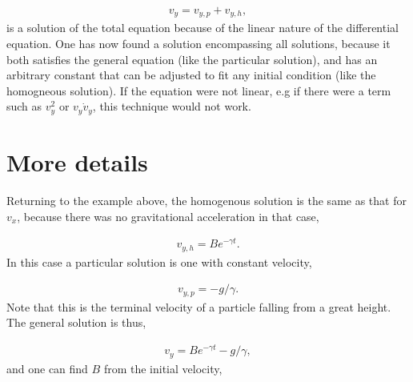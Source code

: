 \documentclass[letterpaper,10pt,english]{sphinxmanual}
\begin{document}
\begin{equation*}
\begin{split}
\begin{equation}
v_y=v_{y,p}+v_{y,h},
\label{_auto9} \tag{9}
\end{equation}
\end{split}
\end{equation*}
is a solution of the total equation because of the linear nature of
the differential equation. One has now found a  solution
encompassing all solutions, because it both satisfies the general
equation (like the particular solution), and has an arbitrary constant
that can be adjusted to fit any initial condition (like the homogneous
solution). If the equation were not linear, e.g if there were a term
such as \(v_y^2\) or \(v_y\dot{v}_y\), this technique would not work.


\section{More details}
\label{\detokenize{chapter1:more-details}}
Returning to the example above, the homogenous solution is the same as
that for \(v_x\), because there was no gravitational acceleration in
that case,




\begin{equation*}
\begin{split}
\begin{equation}
v_{y,h}=Be^{-\gamma t}.
\label{_auto10} \tag{10}
\end{equation}
\end{split}
\end{equation*}
In this case a particular solution is one with constant velocity,




\begin{equation*}
\begin{split}
\begin{equation}
v_{y,p}=-g/\gamma.
\label{_auto11} \tag{11}
\end{equation}
\end{split}
\end{equation*}
Note that this is the terminal velocity of a particle falling from a
great height. The general solution is thus,




\begin{equation*}
\begin{split}
\begin{equation}
v_y=Be^{-\gamma t}-g/\gamma,
\label{_auto12} \tag{12}
\end{equation}
\end{split}
\end{equation*}
and one can find \(B\) from the initial velocity,
\end{document}
